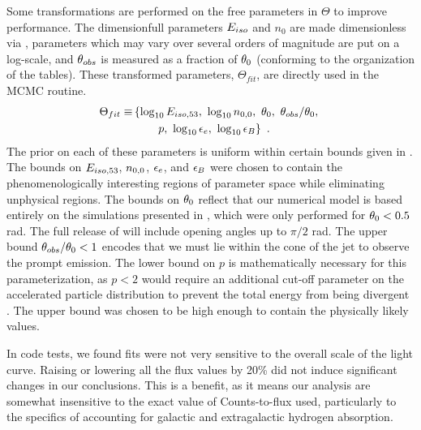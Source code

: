 Some transformations are performed on the free parameters in $\Theta$ to improve performance.  The dimensionfull parameters $E_{iso}$ and $n_0$ are made dimensionless via , parameters which may vary over several orders of magnitude are put on a log-scale, and $\theta_{obs}$ is measured as a fraction of $\theta_0$ (conforming to the organization of the tables).  These transformed parameters, $\Theta_{fit}$, are directly used in the MCMC routine.
\begin{align}
    \Theta_{fit} \equiv& \left \{  \log_{10} E_{iso, 53}, \ \log_{10} n_{0, 0}, \ \theta_0, \ \theta_{obs}  / \theta_0, \right . \nonumber \\
    &\qquad \left . p, \ \log_{10} \epsilon_e, \ \log_{10} \epsilon_B \right \} \ .
\end{align}
The prior on each of these parameters is uniform within certain bounds given in .  The bounds on $E_{iso, 53}$, $n_{0, 0}$, $\epsilon_e$, and $\epsilon_B$ were chosen to contain the phenomenologically interesting regions of parameter space while eliminating unphysical regions.  The bounds on $\theta_0$ reflect that our numerical model is based entirely on the simulations presented in \cite{vanEer12boxfit}, which were only performed for $\theta_0 < 0.5$ rad. The full release of \scalefit{} will include opening angles up to $\pi/2$ rad.  The upper bound $\theta_{obs}/\theta_0<1$ encodes that we must lie within the cone of the jet to observe the prompt emission.  The lower bound on $p$ is mathematically necessary for this parameterization, as $p<2$ would require an additional cut-off parameter on the accelerated particle distribution to prevent the total energy from being divergent \citep[see e.g. discussions in][]{Granot02, vanEer13review}. The upper bound was chosen to be high enough to contain the physically likely values.

In code tests, we found fits were not very sensitive to the overall scale of the light curve.  Raising or lowering all the flux values by 20\% did not induce significant changes in our conclusions.  This is a benefit, as it means our analysis are somewhat insensitive to the exact value of Counts-to-flux used, particularly to the specifics of accounting for galactic and extragalactic hydrogen absorption.

